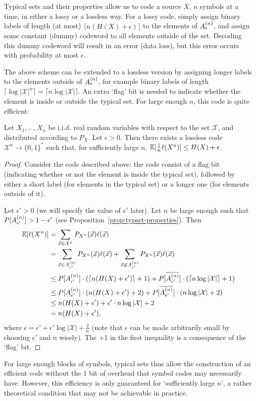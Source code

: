 Typical sets and their properties allow us to code a source $X$, $n$ symbols at a time, in either a lossy or a lossless way. For a lossy code, simply assign binary labels of length (at most) $\lceil n (H(X) + \epsilon)\rceil$ to the elements of $A_{\epsilon}^{(n)}$, and assign some constant (dummy) codeword to all elements outside of the set. Decoding this dummy codeword will result in an error (data loss), but this error occurs with probability at most $\epsilon$.

The above scheme can be extended to a lossless version by assigning longer labels to the elements outside of $A_{\epsilon}^{(n)}$, for example binary labels of length $\lceil \log |\mathcal{X}|^n\rceil = \lceil n \log |\mathcal{X}|\rceil$. An extra `flag' bit is needed to indicate whether the element is inside or outside the typical set. For large enough $n$, this code is quite efficient:
\begin{theorem}
Let $X_1, ..., X_n$ be i.i.d. real random variables with respect to the set $\mathcal{X}$, and distributed according to $P_X$. Let $\epsilon > 0$. Then there exists a lossless code $\mathcal{X}^n \to \{0,1\}^*$ such that, for sufficiently large $n$, $\mathbb{E}[\frac{1}{n} \ell(X^n)] \leq H(X) + \epsilon$.
\end{theorem}
\begin{proof}
Consider the code described above: the code consist of a flag bit (indicating whether or not the element is inside the typical set), followed by either a short label (for elements in the typical set) or a longer one (for elements outside of it).

Let $\epsilon' > 0$ (we will specify the value of $\epsilon'$ later). Let $n$ be large enough such that $P[A_{\epsilon'}^{(n)}] > 1 - \epsilon'$ (see Proposition~\ref{prop:typset-properties}). Then
\begin{align}
\mathbb{E}[\ell(X^n)] &= \sum_{\vec{x} \in \mathcal{X}^n} P_{X^n}(\vec{x}) \ell(\vec{x})\nonumber\\
&= \sum_{\vec{x} \in A_{\epsilon'}^{(n)}} P_{X^n}(\vec{x}) \ell(\vec{x}) + \sum_{\vec{x} \not\in A_{\epsilon'}^{(n)}} P_{X^n}(\vec{x}) \ell(\vec{x})\nonumber\\
&\leq P[A_{\epsilon'}^{(n)}] \cdot (\lceil n (H(X) + \epsilon') \rceil + 1) + P[\overline{A_{\epsilon'}^{(n)}}] \cdot (\lceil n \log |\mathcal{X}| \rceil + 1)\nonumber\\
&\leq P[A_{\epsilon'}^{(n)}] \cdot (n (H(X) + \epsilon') + 2) + P[\overline{A_{\epsilon'}^{(n)}}] \cdot (n \log |\mathcal{X}| + 2)\nonumber\\
&\leq n ( H(X) + \epsilon') + \epsilon' \cdot n \log |\mathcal{X}| + 2\nonumber\\
&= n(H(X) + \epsilon'),
\end{align}
where $\epsilon = \epsilon' + \epsilon' \log |\mathcal{X}| + \frac{2}{n}$ (note that $\epsilon$ can be made arbitrarily small by choosing $\epsilon'$ and $n$ wisely). The +1 in the first inequality is a consequence of the `flag' bit.
\end{proof}
For large enough blocks of symbols, typical sets thus allow the construction of an efficient code without the 1 bit of overhead that symbol codes may necessarily have. However, this efficiency is only guaranteed for `sufficiently large $n$', a rather theoretical condition that may not be achievable in practice.

